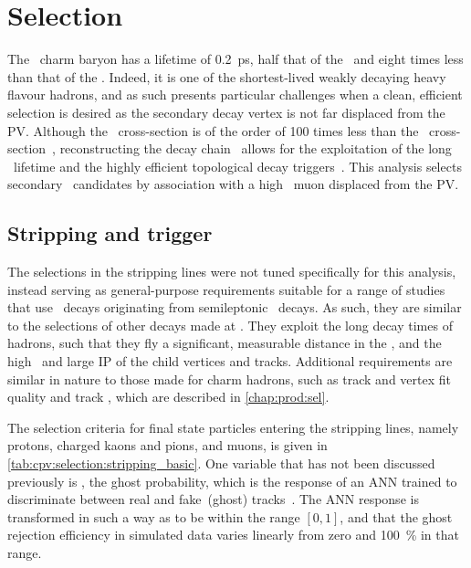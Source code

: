 \chapter{Selection}
\label{chap:cpv:selection}

The \PLambdac\ charm baryon has a lifetime of \SI{0.2}{\pico\second}, half that 
of the \PDzero\ and eight times less than that of the \PBzero.
Indeed, it is one of the shortest-lived weakly decaying heavy flavour hadrons, 
and as such presents particular challenges when a clean, efficient selection is 
desired as the secondary decay vertex is not far displaced from the \ac{PV}.
Although the \bbbar\ cross-section is of the order of 100 times less than the 
\ccbar\ cross-section~\cite{LHCb-PAPER-2012-041,LHCb-PAPER-2013-004}, 
reconstructing the decay chain \LbToLcmuX\ allows for the exploitation of the 
long \PLambdab\ lifetime and the highly efficient topological \Pbottom decay 
triggers~\cite{Gligorov:1384380,Gligorov:2011qxa}.
This analysis selects secondary \PLambdac\ candidates by association with a 
high \pT\ muon displaced from the \ac{PV}.

\section{Stripping and trigger}
\label{chap:cpv:selection:stripping_trigger}

The selections in the stripping lines were not tuned specifically for this 
analysis, instead serving as general-purpose requirements suitable for a range 
of studies that use \LcTophh\ decays originating from semileptonic \PLambdab\ 
decays.
As such, they are similar to the selections of other \Pbottom decays made at 
\lhcb.
They exploit the long decay times of \Pbottom hadrons, such that they fly a 
significant, measurable distance in the \velo, and the high \pT\ and large 
\acl{IP} of the child vertices and tracks.
Additional requirements are similar in nature to those made for charm hadrons, 
such as track and vertex fit quality and track \ipchisq, which are described in 
\cref{chap:prod:sel}.

The selection criteria for final state particles entering the stripping lines, 
namely protons, charged kaons and pions, and muons, is given in 
\cref{tab:cpv:selection:stripping_basic}.
One variable that has not been discussed previously is \pghost, the ghost 
probability, which is the response of an \ac{ANN} trained to discriminate 
between real and fake~(ghost) tracks~\cite{Brehmer:1478372}.
The \ac{ANN} response is transformed in such a way as to be within the range 
$[0, 1]$, and that the ghost rejection efficiency in simulated data varies 
linearly from zero and \SI{100}{\percent} in that range.


